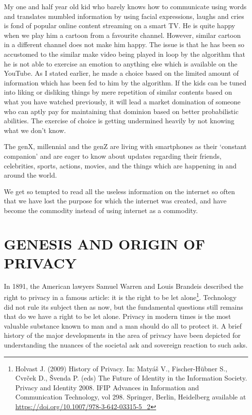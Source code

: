 \begin{multicols}{2}
My one and half year old kid who barely knows how to communicate using words and translates mumbled information by using facial expressions, laughs and cries is fond of popular online content streaming on a smart TV. He is quite happy when we play him a cartoon from a favourite channel. However, similar cartoon in a different channel does not make him happy. The issue is that he has been so accustomed to the similar make video being played in loop by the algorithm that he is not able to exercise an emotion to anything else which is available on the YouTube. As I stated earlier, he made a choice based on the limited amount of information which has been fed to him by the algorithm. If the kids can be tuned into liking or disliking things by mere repetition of similar contents based on what you have watched previously, it will lead a market domination of someone who can aptly pay for maintaining that dominion based on better probabilistic abilities. The exercise of choice is getting undermined heavily by not knowing what we don’t know.

The genX, millennial and the genZ are living with smartphones as their ‘constant companion’ and are eager to know about updates regarding their friends, celebrities, sports, actions, movies, and the things which are happening in and around the world.

We get so tempted to read all the useless information on the internet so often that we have lost the purpose for which the internet was created, and have become the commodity instead of using internet as a commodity.

\section{GENESIS AND ORIGIN OF PRIVACY}

In 1891, the American lawyers Samuel Warren and Louis Brandeis described the right to privacy in a famous article: it is the right to be let alone\footnote{Holvast J. (2009) History of Privacy. In: Matyáš V., Fischer-Hübner S., Cvrček D., Švenda P. (eds) The Future of Identity in the Information Society. Privacy and Identity 2008. IFIP Advances in Information and Communication Technology, vol 298. Springer, Berlin, Heidelberg available at\url{ https://doi.org/10.1007/978-3-642-03315-5\_2}}. Technology did not rule its subject then as now, but the fundamental questions still remains that do we have a right to be let alone. Privacy in modern times is the most valuable substance known to man and a man should do all to protect it. A brief history of the major developments in the area of privacy have been depicted for understanding the nuances of the societal ask and sovereign reaction to such asks.


\end{multicols}
